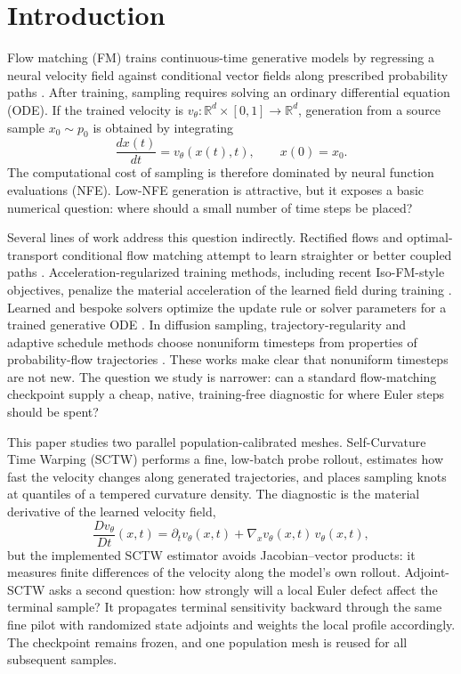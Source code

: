 \section{Introduction}
\label{sec:introduction}

Flow matching (FM) trains continuous-time generative models by regressing a neural velocity field
against conditional vector fields along prescribed probability paths
\citep{lipman2023flow,tong2023conditional,albergo2023stochastic}. After training, sampling
requires solving an ordinary differential equation (ODE). If the trained velocity is
$v_\theta:\mathbb{R}^d \times [0,1] \to \mathbb{R}^d$, generation from a source sample
$x_0 \sim p_0$ is obtained by integrating
\begin{equation}
  \frac{d x(t)}{d t} = v_\theta(x(t),t), \qquad x(0)=x_0.
  \label{eq:fm-ode}
\end{equation}
The computational cost of sampling is therefore dominated by neural function evaluations (NFE).
Low-NFE generation is attractive, but it exposes a basic numerical question: where should a small
number of time steps be placed?

Several lines of work address this question indirectly. Rectified flows and optimal-transport
conditional flow matching attempt to learn straighter or better coupled paths
\citep{liu2022rectified,tong2023conditional}. Acceleration-regularized training methods, including
recent Iso-FM-style objectives, penalize the material acceleration of the learned field during
training \citep{khan2026isofm}. Learned and bespoke solvers optimize the update rule or solver
parameters for a trained generative ODE \citep{shaul2024bespoke,shaul2024bns}. In diffusion
sampling, trajectory-regularity and adaptive schedule methods choose nonuniform timesteps from
properties of probability-flow trajectories \citep{chen2024trajectory,chen2024adaptive}. These
works make clear that nonuniform timesteps are not new. The question we study is narrower:
can a standard flow-matching checkpoint supply a cheap, native, training-free diagnostic for where
Euler steps should be spent?

This paper studies two parallel population-calibrated meshes. Self-Curvature Time Warping (SCTW)
performs a fine, low-batch probe rollout, estimates how fast the velocity changes along generated
trajectories, and places sampling knots at quantiles of a tempered curvature density. The
diagnostic is the material derivative of the learned velocity field,
\begin{equation}
  \frac{D v_\theta}{D t}(x,t)
  =
  \partial_t v_\theta(x,t)
  +
  \nabla_x v_\theta(x,t)\, v_\theta(x,t),
  \label{eq:material-derivative}
\end{equation}
but the implemented SCTW estimator avoids Jacobian--vector products: it measures finite
differences of the velocity along the model's own rollout. Adjoint-SCTW asks a second question:
how strongly will a local Euler defect affect the terminal sample? It propagates terminal
sensitivity backward through the same fine pilot with randomized state adjoints and weights the
local profile accordingly. The checkpoint remains frozen, and one population mesh is reused for
all subsequent samples.

